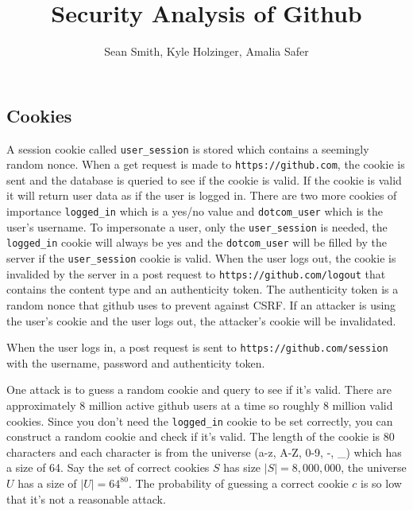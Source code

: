 \documentclass{lposter}
\author{Sean Smith, Kyle Holzinger, Amalia Safer}
\title{Security Analysis of Github}
\theoremstyle{plain}
\theoremstyle{definition}
\renewcommand{\tt}[1]{\texttt{#1}}
\begin{document}
\begin{poster}





\section{Cookies}

A session cookie called \tt{user\_session} is stored which contains a seemingly random nonce. When a get request is made to \tt{https://github.com}, the cookie is sent and the database is queried to see if the cookie is valid. If the cookie is valid it will return user data as if the user is logged in. There are two more cookies of importance \tt{logged\_in} which is a yes/no value and \tt{dotcom\_user} which is the user's username. To impersonate a user, only the \tt{user\_session} is needed, the \tt{logged\_in} cookie will always be yes and the \tt{dotcom\_user} will be filled by the server if the \tt{user\_session} cookie is valid. When the user logs out, the cookie is invalided by the server in a post request to \tt{https://github.com/logout} that contains the content type and an authenticity token. The authenticity token is a random nonce that github uses to prevent against CSRF. If an attacker is using the user's cookie and the user logs out, the attacker's cookie will be invalidated.


When the user logs in, a post request is sent to \tt{https://github.com/session} with the username, password and authenticity token.

One attack is to guess a random cookie and query to see if it's valid. There are approximately 8 million active github users at a time so roughly 8 million valid cookies. Since you don't need the \tt{logged\_in} cookie to be set correctly, you can construct a random cookie and check if it's valid. The length of the cookie is 80 characters and each character is from the universe (a-z, A-Z, 0-9, -, \_) which has a size of 64. Say the set of correct cookies $S$  has size $|S| = 8,000,000$, the universe $U$ has a size of $|U| = 64^{80}$. The probability of guessing a correct cookie $c$ is so low that it's not a reasonable attack.


\end{poster}
\end{document}
